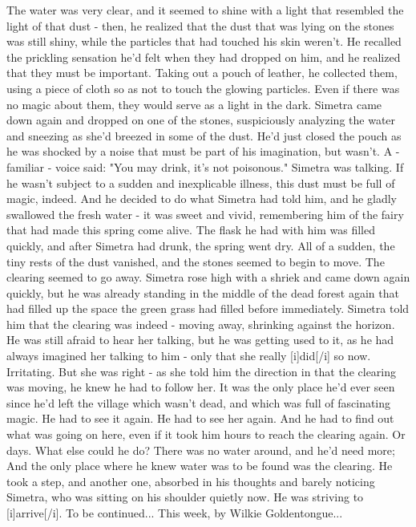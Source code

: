 The water was very clear, and it seemed to shine with a light that resembled the light of that dust - then, he realized that the dust that was lying on the stones was still shiny, while the particles that had touched his skin weren't. 
He recalled the prickling sensation he'd felt when they had dropped on him, and he realized that they must be important. Taking out a pouch of leather, he collected them, using a piece of cloth so as not to touch the glowing particles. Even if there was no magic about them, they would serve as a light in the dark. 
Simetra came down again and dropped on one of the stones, suspiciously analyzing the water and sneezing as she'd breezed in some of the dust. 
He'd just closed the pouch as he was shocked by a noise that must be part of his imagination, but wasn't. A - familiar - voice said: "You may drink, it's not poisonous." 
Simetra was talking. 
If he wasn't subject to a sudden and inexplicable illness, this dust must be full of magic, indeed. 
And he decided to do what Simetra had told him, and he gladly swallowed the fresh water - it was sweet and vivid, remembering him of the fairy that had made this spring come alive. The flask he had with him was filled quickly, and after Simetra had drunk, the spring went dry. 
All of a sudden, the tiny rests of the dust vanished, and the stones seemed to begin to move. The clearing seemed to go away. 
Simetra rose high with a shriek and came down again quickly, but he was already standing in the middle of the dead forest again that had filled up the space the green grass had filled before immediately. 
Simetra told him that the clearing was indeed - moving away, shrinking against the horizon. He was still afraid to hear her talking, but he was getting used to it, as he had always imagined her talking to him - only that she really [i]did[/i] so now. Irritating. 
But she was right - as she told him the direction in that the clearing was moving, he knew he had to follow her. It was the only place he'd ever seen since he'd left the village which wasn't dead, and which was full of fascinating magic. 
He had to see it again. 
He had to see her again. 
And he had to find out what was going on here, even if it took him hours to reach the clearing again. Or days. 
What else could he do? There was no water around, and he'd need more; And the only place where he knew water was to be found was the clearing. 
He took a step, and another one, absorbed in his thoughts and barely noticing Simetra, who was sitting on his shoulder quietly now. 
He was striving to [i]arrive[/i]. 
To be continued...
This week, by Wilkie Goldentongue...
